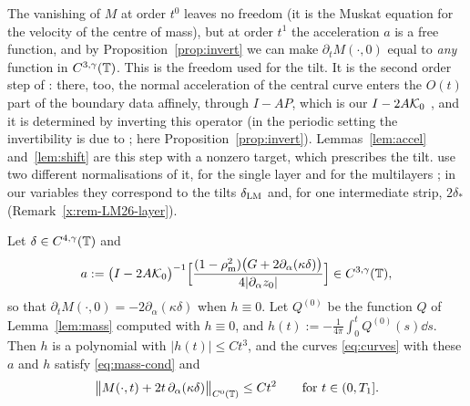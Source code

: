 The vanishing of $M$ at order $t^0$ leaves no freedom (it is the Muskat equation for the velocity of the centre of mass), but at order $t^1$ the acceleration $a$ is a free function, and by
Proposition~\ref{prop:invert} we can make $\partial_tM(\cdot,0)$ equal to \emph{any} function in $C^{3,\gamma}(\mathbb{T})$. This is the freedom used for the tilt. It is the second order step of
\cite{LM26}: there, too, the normal acceleration of the central curve enters the $O(t)$ part of the boundary data affinely, through $I-AP$, which is our $I-2A\mathcal{K}_0$
\cite[Lemma~5.3, (5.21) and (8.41)]{LM26}, and it is determined by inverting this operator \cite[Prop.~6.1]{LM26} (in the periodic setting the invertibility is due to \cite{CCG11}; here
Proposition~\ref{prop:invert}). Lemmas~\ref{lem:accel} and~\ref{lem:shift} are this step with a nonzero target, which prescribes the tilt. \cite{LM26} use two different normalisations of
it, for the single layer \cite[(5.16)]{LM26} and for the multilayers \cite[(8.41)]{LM26}; in our variables they correspond to the tilts $\delta_{\rm LM}$ and, for one intermediate strip,
$2\delta_*$ (Remark~\ref{x:rem-LM26-layer}).

\begin{lemma}\label{lem:shift}
Let $\delta\in C^{4,\gamma}(\mathbb{T})$ and
\begin{equation}\label{eq:a-choice}
a:=\big(I-2A\mathcal{K}_0\big)^{-1}\Big[\frac{(1-\rho_{\mathrm m}^2)\big(G+2\partial_\alpha(\kappa\delta)\big)}{4|\partial_\alpha z_0|}\Big]\in C^{3,\gamma}(\mathbb{T}),
\end{equation}
so that $\partial_tM(\cdot,0)=-2\partial_\alpha(\kappa\delta)$ when $h\equiv0$. Let $Q^{(0)}$ be the function $Q$ of Lemma~\ref{lem:mass} computed with $h\equiv0$, and $h(t):=-\frac1{4\pi}\int_0^tQ^{(0)}(s)\dd s$. Then $h$ is
a polynomial with $|h(t)|\le Ct^3$, and the curves \eqref{eq:curves} with these $a$ and $h$ satisfy \eqref{eq:mass-cond} and
\[
\big\|M(\cdot,t)+2t\,\partial_\alpha(\kappa\delta)\big\|_{C^0(\mathbb{T})}\le Ct^2\qquad\text{for }t\in(0,T_1].
\]
\end{lemma}

